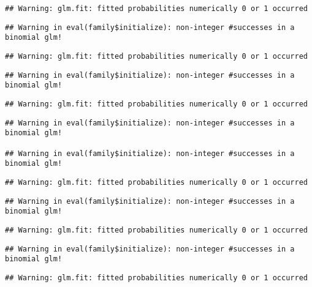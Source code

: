\documentclass[
]{article}
\begin{document}
\begin{verbatim}
## Warning: glm.fit: fitted probabilities numerically 0 or 1 occurred
\end{verbatim}

\begin{verbatim}
## Warning in eval(family$initialize): non-integer #successes in a binomial glm!
\end{verbatim}

\begin{verbatim}
## Warning: glm.fit: fitted probabilities numerically 0 or 1 occurred
\end{verbatim}

\begin{verbatim}
## Warning in eval(family$initialize): non-integer #successes in a binomial glm!
\end{verbatim}

\begin{verbatim}
## Warning: glm.fit: fitted probabilities numerically 0 or 1 occurred
\end{verbatim}

\begin{verbatim}
## Warning in eval(family$initialize): non-integer #successes in a binomial glm!

## Warning in eval(family$initialize): non-integer #successes in a binomial glm!
\end{verbatim}

\begin{verbatim}
## Warning: glm.fit: fitted probabilities numerically 0 or 1 occurred
\end{verbatim}

\begin{verbatim}
## Warning in eval(family$initialize): non-integer #successes in a binomial glm!
\end{verbatim}

\begin{verbatim}
## Warning: glm.fit: fitted probabilities numerically 0 or 1 occurred
\end{verbatim}

\begin{verbatim}
## Warning in eval(family$initialize): non-integer #successes in a binomial glm!
\end{verbatim}

\begin{verbatim}
## Warning: glm.fit: fitted probabilities numerically 0 or 1 occurred
\end{verbatim}
\end{document}
